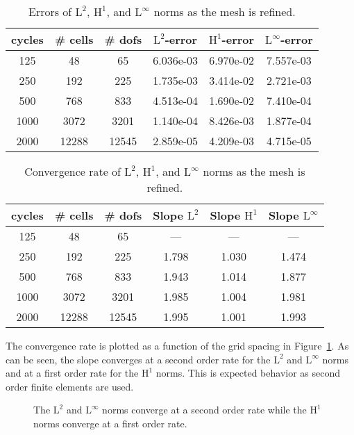 \documentclass{article}
\begin{document}
\begin{table}
  \centering
  \begin{tabular}{|c|c|c|c|c|c|} \hline
	  cycles & \# cells & \# dofs & $\textrm{L}^2$-error & $\textrm{H}^1$-error & $\textrm{L}^\infty$-error \\ \hline
	  125 & 48 & 65 & 6.036e-03 & 6.970e-02 & 7.557e-03\\ \hline
	  250 & 192 & 225 & 1.735e-03 & 3.414e-02 & 2.721e-03 \\ \hline
	  500 & 768 & 833 & 4.513e-04 & 1.690e-02 & 7.410e-04 \\ \hline
	  1000 & 3072 & 3201 & 1.140e-04 & 8.426e-03 & 1.877e-04 \\ \hline
	  2000 & 12288 & 12545 & 2.859e-05 & 4.209e-03 & 4.715e-05 \\ \hline
  \end{tabular}
  \caption{\label{tbl:convergenceerrors}Errors of $\textrm{L}^2$, $\textrm{H}^1$, and $\textrm{L}^\infty$ norms as the mesh is refined.}
\end{table}

\begin{table}
  \centering
  \begin{tabular}{|c|c|c|c|c|c|} \hline
	  cycles & \# cells & \# dofs & Slope $\textrm{L}^2$ & Slope $\textrm{H}^1$  & Slope $\textrm{L}^\infty$ \\ \hline
	  125 & 48 & 65 & --- & --- & --- \\ \hline
	  250 & 192 & 225 & 1.798 & 1.030 & 1.474 \\ \hline
	  500 & 768 & 833 & 1.943 & 1.014 & 1.877 \\ \hline
	  1000 & 3072 & 3201 & 1.985 & 1.004 & 1.981 \\ \hline
	  2000 & 12288 & 12545 & 1.995 & 1.001  & 1.993 \\ \hline
  \end{tabular}
  \caption{\label{tbl:convergencerate}Convergence rate of $\textrm{L}^2$, $\textrm{H}^1$, and $\textrm{L}^\infty$ norms as the mesh is refined.}
\end{table}

The convergence rate is plotted as a function of the grid spacing in Figure~\ref{fig:gridconvergence}.
As can be seen, the slope converges at a second order rate for the \(\textrm{L}^2\) and \(\textrm{L}^\infty\) norms and at a first order rate for the \(\textrm{H}^1\) norms.
This is expected behavior as second order finite elements are used.

\begin{figure}[htbp]
  \centering
  
  \caption{\label{fig:gridconvergence}The $\textrm{L}^2$ and $\textrm{L}^\infty$ norms converge at a second order rate while the $\textrm{H}^1$ norms converge at a first order rate.}
\end{figure}
\end{document}

